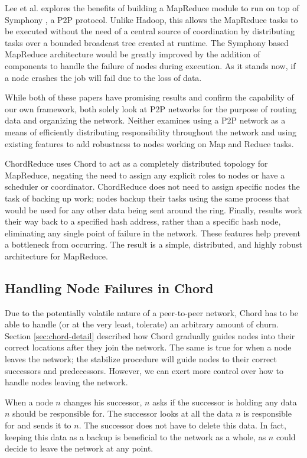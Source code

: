 Lee et al. \cite{leemap} explores the benefits of building a MapReduce module to run on top of Symphony \cite{symphony},  a P2P protocol.  Unlike Hadoop, this allows the MapReduce tasks to be executed without the need of a central source of coordination by distributing tasks over a bounded broadcast tree created at runtime.  The Symphony based MapReduce architecture would be greatly improved by the addition of components to handle the failure of nodes during execution.  As it stands now, if a node crashes the job will fail due to the loss of data.

While both of these papers have promising results and confirm the capability of our own framework, both solely look at P2P networks for the purpose of routing data and organizing the network. Neither examines using a P2P network as a means of efficiently distributing responsibility throughout the network and using existing features to add robustness to nodes working on Map and Reduce tasks.  

ChordReduce uses Chord to act as a completely distributed topology for MapReduce, negating the need to assign any explicit roles to nodes or have a scheduler or coordinator.  ChordReduce does not need to assign specific nodes the task of backing up work; nodes backup their tasks using the same process that would be used for any other data being sent around the ring.  Finally, results work their way back to a specified hash address, rather than a specific hash node, eliminating any single point of failure in the network.  These features help prevent a bottleneck from occurring. The result is a simple, distributed, and highly robust architecture for MapReduce.


\subsection{Handling Node Failures in Chord}
\label{sec:chordreduce-robust}
Due to the potentially volatile nature of a peer-to-peer network, Chord has to be able to handle (or at the very least, tolerate) an arbitrary amount of churn.  Section \ref{sec:chord-detail} described how Chord gradually guides nodes into their correct locations after they join the network.  The same is true for when a node leaves the network; the stabilize procedure will guide nodes to their correct successors and predecessors.  However, we can exert more control over how to handle nodes leaving the network.

When a node $n$ changes his successor, $n$ asks if the successor is holding any data $n$ should be responsible for.  The successor looks at all the data $n$ is responsible for and sends it to $n$.  The successor does not have to delete this data. In fact, keeping this data as a backup is beneficial to the network as a whole, as $n$ could decide to leave the network at any point. 

